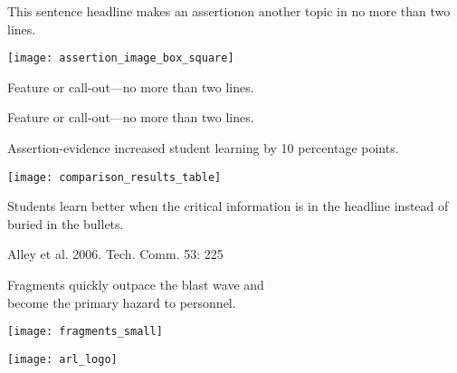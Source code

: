 \documentclass[t]{beamer}
\begin{document}
\begin{frame}[t]{This sentence headline makes an assertion\newline on another topic in no more than two lines.}

\begin{multicols}{2}
\begin{center}
\texttt{[image: assertion\_image\_box\_square]}
\end{center}

\columnbreak

Feature or call-out—no more than two lines.

\vspace{8\baselineskip}

Feature or call-out—no more than two lines.

\end{multicols}


\end{frame}

%

\begin{frame}{Assertion-evidence increased student learning by 10 percentage points.}

\begin{multicols}{2}
\texttt{[image: comparison\_results\_table]}

\columnbreak


Students learn better when the critical information is in the headline instead of buried in the bullets.

\end{multicols}

\tinyfill Alley et al. 2006. Tech. Comm. 53: 225

\end{frame}

%

\begin{frame}[t]{Fragments quickly outpace the blast wave and\\become the primary hazard to personnel.}

\centering

\texttt{[image: fragments\_small]}

\vfilll

\hfill \texttt{[image: arl\_logo]}
\end{frame}
\end{document}
